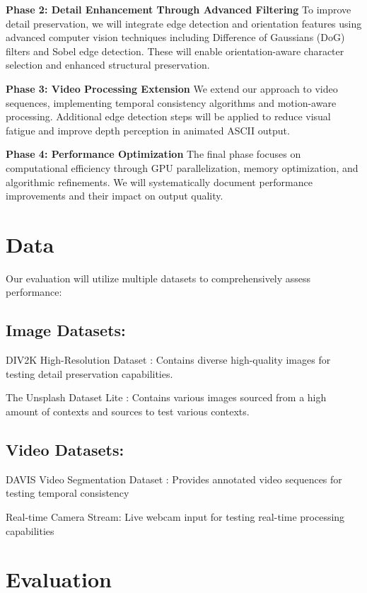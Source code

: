 \documentclass[10pt,twocolumn,letterpaper]{article}
\begin{document}
\textbf{Phase 2: Detail Enhancement Through Advanced Filtering}
To improve detail preservation, we will integrate edge detection and orientation features using advanced computer vision techniques including Difference of Gaussians (DoG) filters and Sobel edge detection. These will enable orientation-aware character selection and enhanced structural preservation.

\textbf{Phase 3: Video Processing Extension}
We extend our approach to video sequences, implementing temporal consistency algorithms and motion-aware processing. Additional edge detection steps will be applied to reduce visual fatigue and improve depth perception in animated ASCII output.

\textbf{Phase 4: Performance Optimization}
The final phase focuses on computational efficiency through GPU parallelization, memory optimization, and algorithmic refinements. We will systematically document performance improvements and their impact on output quality.

\section{Data}

Our evaluation will utilize multiple datasets to comprehensively assess performance:

\subsection{Image Datasets:}

DIV2K High-Resolution Dataset \cite{div2k}: Contains diverse high-quality images for testing detail preservation capabilities.

The Unsplash Dataset Lite \cite{unsplash}: Contains various images sourced from a high amount of contexts and sources to test various contexts.

\subsection{Video Datasets:}
DAVIS Video Segmentation Dataset \cite{davis2017}: Provides annotated video sequences for testing temporal consistency


Real-time Camera Stream: Live webcam input for testing real-time processing capabilities

\section{Evaluation}
\end{document}
